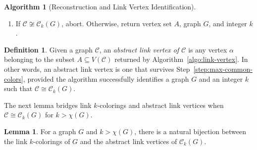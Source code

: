 \documentclass{amsart}
\theoremstyle{hypothesisstyle}
\theoremstyle{definition}
\newtheorem{definition}[theorem]{Definition}
\newtheorem{algorithm}[alg]{Algorithm}
\newtheorem{lemma}[theorem]{Lemma}
\theoremstyle{remark}
\numberwithin{equation}{section}
\newcommand{\C}{\mathcal C}
\begin{document}
\begin{algorithm}[Reconstruction and Link Vertex Identification]
\begin{enumerate}
    \item\label{step:alg1-return} If $\C\not\cong \C_k(G)$, abort. Otherwise, return vertex set $A$, graph $G$, and integer $k$.
\end{enumerate}
\end{algorithm}

\begin{definition}\label{def:link-vertex}
    Given a graph $\C$, an \emph{abstract link vertex of $\C$} is any vertex $\alpha$ belonging to the subset $A\subseteq V(\C)$ returned by Algorithm~\ref{algo:link-vertex}. 
    In other words, an abstract link vertex is one that survives Step~\ref{step:max-common-colors}, provided the algorithm successfully identifies a graph $G$ and an integer $k$ such that $\C\cong\C_k(G)$.
\end{definition}

The next lemma bridges link $k$-colorings and abstract link vertices when $\mathcal{C}\cong \mathcal{C}_k(G)$ for $k > \chi(G)$.

\begin{lemma}\label{lem:link-equivalence}
    For a graph $G$ and $k>\chi(G)$, there is a natural bijection between the link $k$-colorings of $G$ and the abstract link vertices of $\C_k(G)$.
\end{lemma}
\end{document}
